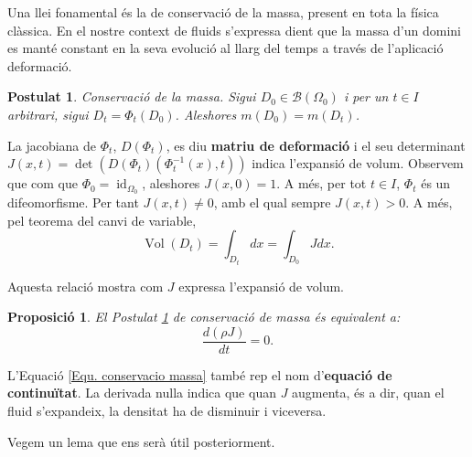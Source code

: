 \documentclass{article}
\numberwithin{equation}{section}
\DeclareMathOperator{\id}{id}
\DeclareMathOperator{\Vol}{Vol}
\newtheorem{proposicio}{Proposici\'{o}}[section]
\newtheorem{postulat}{Postulat}[section]
\begin{document}
Una llei fonamental \'{e}s la de conservaci\'{o} de la massa, present en tota la f\'{i}sica cl\`{a}ssica. En el nostre context de fluids s'expressa dient que la massa d'un domini es mant\'{e} constant en la seva evoluci\'{o} al llarg del temps a trav\'{e}s de l'aplicaci\'{o} deformaci\'{o}.

\begin{postulat}\label{Pos: conservacio massa}
Conservaci\'{o} de la massa. Sigui $D_0\in\mathcal{B}(\Omega_0)$ i per un $t\in I$ arbitrari, sigui $D_t=\Phi_t(D_0)$. Aleshores $m(D_0)=m(D_t)$.
\end{postulat}

La jacobiana de $\Phi_t$, $D(\Phi_t)$, es diu \textbf{matriu de deformaci\'{o}} i el seu determinant $J(x,t)=\det(D(\Phi_t)(\Phi_t^{-1}(x),t))$ indica l'expansi\'{o} de volum.
Observem que com que $\Phi_0=\id_{\Omega_0}$, aleshores $J(x,0)=1$. A m\'{e}s, per tot $t\in I$, $\Phi_t$ \'{e}s un difeomorfisme. Per tant $J(x,t)\neq0$, amb el qual sempre $J(x,t)>0$. A m\'{e}s, pel teorema del canvi de variable,
\[\Vol(D_t)=\int_{D_t}dx=\int_{D_0}Jdx.\]

Aquesta relaci\'{o} mostra com $J$ expressa l'expansi\'{o} de volum.

\begin{proposicio}\label{Pro: conservacio massa}
El Postulat \ref{Pos: conservacio massa} de conservaci\'{o} de massa \'{e}s equivalent a:
\begin{equation}\label{Equ. conservacio massa}
\frac{d(\rho J)}{dt}=0.
\end{equation}
\end{proposicio}

L'Equaci\'{o} \eqref{Equ. conservacio massa} tamb\'{e} rep el nom d'\textbf{equaci\'{o} de continu\"{i}tat}. La derivada nul\textperiodcentered la indica que quan $J$ augmenta, \'{e}s a dir, quan el fluid s'expandeix, la densitat ha de disminuir i viceversa.

Vegem un lema que ens ser\`{a} \'{u}til posteriorment.
\end{document}
